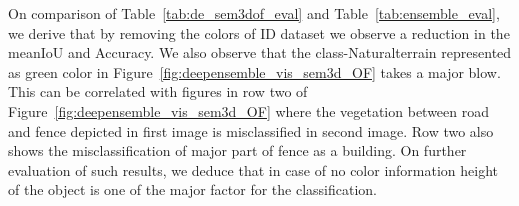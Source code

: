     \begin{table}[h!]
        \caption{Illustration of performance of RandLA-Net on Semantic3D wihtout color over number of ensembles. meanIOU and IOU per class and overall accuracy are represented here.
        C1 to C8 are the classes of Semantic3D which are Manmadeterrain, Naturalterrain, Highvegetation, Lowvegetation, Buildings, Hardscapes, Scanningartifacts, and Cars.}
        \label{tab:de_sem3dof_eval}
    \end{table}
    On comparison of Table~\ref{tab:de_sem3dof_eval} and Table~\ref{tab:ensemble_eval}, we derive that by removing the colors of ID dataset we observe a reduction in the meanIoU and Accuracy.
    We also observe that the class-Naturalterrain represented as green color in Figure~\ref{fig:deepensemble_vis_sem3d_OF} takes a major blow.
    This can be correlated with figures in row two of Figure~\ref{fig:deepensemble_vis_sem3d_OF} where the vegetation between road and fence depicted in first image is misclassified in second image.
    Row two also shows the misclassification of major part of fence as a building.
    On further evaluation of such results, we deduce that in case of no color information height of the object is one of the major factor for the classification.
